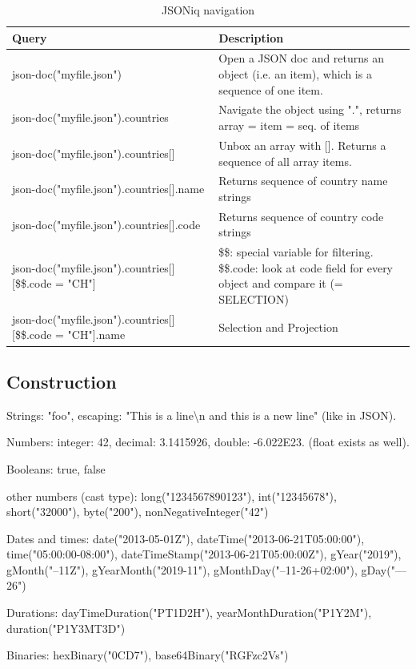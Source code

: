 \documentclass[11pt,oneside,a4paper]{article}
\begin{document}
{\begin{table}[hb!]
\begin{tabular}{|p{100mm}|p{80mm}|}
	\hline 
	\textbf{Query} & \textbf{Description} \\ 
	\hline 
	json-doc("myfile.json") & Open a JSON doc and returns an object (i.e. an item), which is a sequence of one item. \\ 
	\hline 
	json-doc("myfile.json").countries & Navigate the object using ".", returns array = item = seq. of items \\ 
	\hline 
	json-doc("myfile.json").countries[] & Unbox an array with []. Returns a sequence of all array items. \\ 
	\hline 
	json-doc("myfile.json").countries[].name & Returns sequence of country name strings \\ 
	\hline 
	json-doc("myfile.json").countries[].code & Returns sequence of country code strings \\ 
	\hline 
	json-doc("myfile.json").countries[][\$\$.code = "CH"] & \$\$: special variable for filtering. \$\$.code: look at code field for every object and compare it (= SELECTION) \\ 
	\hline 
	json-doc("myfile.json").countries[][\$\$.code = "CH"].name & Selection and Projection \\ 
	\hline 
	\end{tabular}
	\caption{JSONiq navigation}
\end{table}

\subsection{Construction}

\begin{compactitem}
\item Strings: "foo", escaping: "This is a line\textbackslash n and this is a new line" (like in JSON).
\item Numbers: integer: 42, decimal: 3.1415926, double: -6.022E23. (float exists as well).
\item Booleans: true, false
\item other numbers (cast type): long("1234567890123"), int("12345678"), short("32000"), byte("200"), nonNegativeInteger("42")
\item Dates and times: date("2013-05-01Z"), dateTime("2013-06-21T05:00:00"), time("05:00:00-08:00"), dateTimeStamp("2013-06-21T05:00:00Z"), gYear("2019"), gMonth("--11Z"), gYearMonth("2019-11"), gMonthDay("--11-26+02:00"), gDay("---26")
\item Durations: dayTimeDuration("PT1D2H"), yearMonthDuration("P1Y2M"), duration("P1Y3MT3D")
\item Binaries: hexBinary("0CD7"), base64Binary("RGFzc2Vs")\\
\end{compactitem}

}
\end{document}
